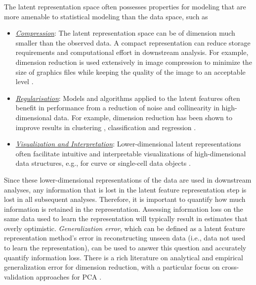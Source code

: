 The latent representation space often possesses properties for modeling that are more amenable to statistical modeling than the data space, such as
\begin{itemize}
    \item \emph{\underline{Compression}}: The latent representation space can be of dimension much smaller than the observed data. A compact representation can reduce storage requirements and computational effort in downstream analysis. For example, dimension reduction is used extensively in image compression to minimize the size of graphics files while keeping the quality of the image to an acceptable level \parencite{marcellin_overview_2000}.
    \item \emph{\underline{Regularisation}}: Models and algorithms applied to the latent features often benefit in performance from a reduction of noise and collinearity in high-dimensional data. For example, dimension reduction has been shown to improve results in clustering \parencite{niu_dimensionality_2011}, classification \parencite{wang_role_2014} and regression \parencite{cook_fisher_2007}.
    \item \emph{\underline{Visualization and Interpretation}}: Lower-dimensional latent representations often facilitate intuitive and interpretable visualizations of high-dimensional data structures, e.g., for curve or single-cell data objects \parencite{jones_displaying_1992, maaten_visualizing_2008, hyndman_rainbow_2010, becht_dimensionality_2019}.
\end{itemize}

Since these lower-dimensional representations of the data are used in downstream analyses, any information that is lost in the latent feature representation step is lost in all subsequent analyses. 
Therefore, it is important to quantify how much information is retained in the representation. 
Assessing information loss on the same data used to learn the representation will typically result in estimates that overly optimistic.
\emph{Generalization error}, which can be defined as a latent feature representation method's error in reconstructing unseen data (i.e., data not used to learn the representation), can be used to answer this question and accurately quantify information loss. 
There is a rich literature on analytical and empirical generalization error for dimension reduction, with a particular focus on cross-validation approaches for PCA \parencite[see, e.g.,][]{becht_dimensionality_2019, wold_cross-validatory_1978, eastment_cross-validatory_1982,krzanowski_cross-validation_1987, minka_automatic_2000, rajan_bayesian_1994, camacho_cross-validation_2014, diana_cross-validation_2002, hubert_fast_2007, josse_selecting_2012, saccenti_use_2015}.

